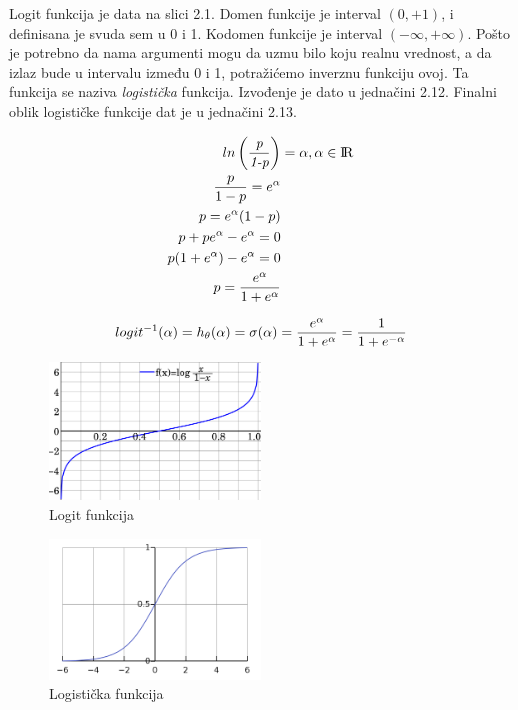 \documentclass[a4paper,12pt]{report}
\begin{document}
Logit funkcija je data na slici 2.1. Domen funkcije je interval $ (0, +1) $, i definisana je svuda sem u 0 i 1. Kodomen funkcije je interval 
$ (-\infty, +\infty) $. Pošto je potrebno da nama argumenti mogu da uzmu bilo koju realnu vrednost, a da izlaz bude u intervalu između 0 i 1, potražićemo inverznu funkciju ovoj. Ta funkcija se naziva \textit{logistička} funkcija. Izvođenje je dato u jednačini 2.12. Finalni oblik logističke funkcije dat je u jednačini 2.13.

\begin{equation}
\begin{split}
ln \left( \frac{\textit{p}}{\textit{1-p}} \right) & = \alpha, \alpha \in \rm I\!R\\  
	\frac{p}{1-p} = e^\alpha\\
	p = e^\alpha(1-p)\\
	p + pe^\alpha - e^\alpha  = 0\\
	p(1+e^\alpha) - e^\alpha  = 0\\
	p  = \frac{e^\alpha}{1+e^\alpha}
\end{split}
\end{equation}

\begin{equation}\label{eq:hypothesis}
 logit^{-1}(\alpha) = h\textsubscript{$\theta$}(\alpha) = \sigma(\alpha) = \frac{e^\alpha}{1+e^\alpha} =\frac{1}{1+e^{- \alpha}}
\end{equation}
\begin{figure}
    \centering
    \includegraphics[width=0.5\textwidth]{logit.png}
    \caption{Logit funkcija}\label{fig:prettypic}
\end{figure}
\begin{figure}
    \centering
    \includegraphics[width=0.5\textwidth]{logistic.png}
    \caption{Logistička funkcija}\label{fig:prettypic}
\end{figure}
\end{document}
